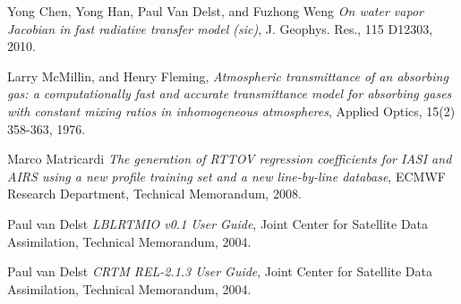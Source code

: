 \clearpage



\begin{thebibliography}{9}

  Yong Chen, Yong Han, Paul Van Delst, and Fuzhong Weng
  \textit{ On water vapor Jacobian in fast radiative transfer model (sic)},
  J. Geophys. Res.,
  115 D12303,
  2010.
  
  Larry McMillin, and Henry Fleming,
  \textit{ Atmospheric transmittance of an absorbing gas: a computationally fast and accurate transmittance model for absorbing gases with constant mixing ratios in inhomogeneous atmospheres},
  Applied Optics,
  15(2) 358-363,
  1976. 
  
  Marco Matricardi
  \textit{The generation of RTTOV regression coefficients for IASI and AIRS using a new profile training set and a new line-by-line database},
  ECMWF Research Department,
  Technical Memorandum,
  2008. 

  Paul van Delst
  \textit{LBLRTMIO v0.1 User Guide},
   Joint Center for Satellite Data Assimilation,
  Technical Memorandum,
  2004. 
  
  Paul van Delst
  \textit{CRTM REL-2.1.3 User Guide},
  Joint Center for Satellite Data Assimilation,
  Technical Memorandum,
  2004. 

\end{thebibliography}

\newpage

